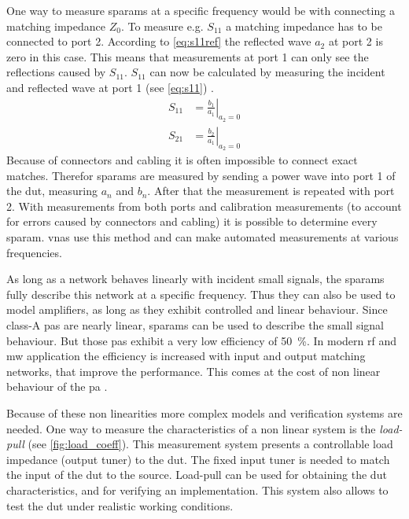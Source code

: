 \documentclass[12pt,a4paper,parskip=full,abstract=true,BCOR=10mm,twoside,open=right]{scrreprt}
\begin{document}
One way to measure \glspl{sparam} at a specific frequency would be with connecting
a matching impedance $Z_0$. To measure e.g. $S_{11}$ a matching impedance has to
be connected to port 2. According to \cref{eq:s11ref} the reflected wave $a_2$
at port 2 is zero in this case. This means that measurements at port 1 can only see the
reflections caused by $S_{11}$. $S_{11}$ can now be calculated by measuring the incident
and reflected wave at port 1 (see \cref{eq:s11}) \cite{agilent_an_154}.
\begin{align}
    \label{eq:s11} S_{11} & = \left.\frac{b_1}{a_1} \right\rvert_{a_2 = 0}\\
    \label{eq:s21} S_{21} & = \left.\frac{b_2}{a_1} \right\rvert_{a_2 = 0}
\end{align}
Because of connectors and cabling it is often impossible to connect exact matches. Therefor
\glspl{sparam} are measured by sending a power wave into port 1 of the \gls{dut}, measuring
$a_n$ and $b_n$. After that the measurement is repeated with port 2. With measurements from
both ports and calibration measurements (to account for errors caused by connectors and
cabling) it is possible to determine every \gls{sparam}. \Glspl{vna} use this method
and can make automated measurements at various frequencies.

As long as a network behaves linearly with incident small signals, the \glspl{sparam}
fully describe this network at a specific frequency. Thus they can also be used
to model amplifiers, as long as they exhibit controlled and linear behaviour. Since
class-A \glspl{pa} are nearly linear, \glspl{sparam} can be used to describe the small
signal behaviour. But those \glspl{pa} exhibit a very low efficiency of \SI{50}{\percent}.
In modern \gls{rf} and \gls{mw} application the efficiency is increased with input and
output matching networks, that improve the performance. This comes at the cost of non
linear behaviour of the \gls{pa} \cite{ghannouchi_load-pull_2013}.

Because of these non linearities more complex models and verification systems are
needed. One way to measure the characteristics of a non linear system is the
{\it load-pull} (see \cref{fig:load_coeff}). This measurement system presents a
controllable load impedance (output tuner) to the \gls{dut}. The fixed input tuner is
needed to match the input of the \gls{dut} to the source. Load-pull can be used for obtaining the
\gls{dut} characteristics, and for verifying an implementation. This system also
allows to test the \gls{dut} under realistic working conditions.
\end{document}
